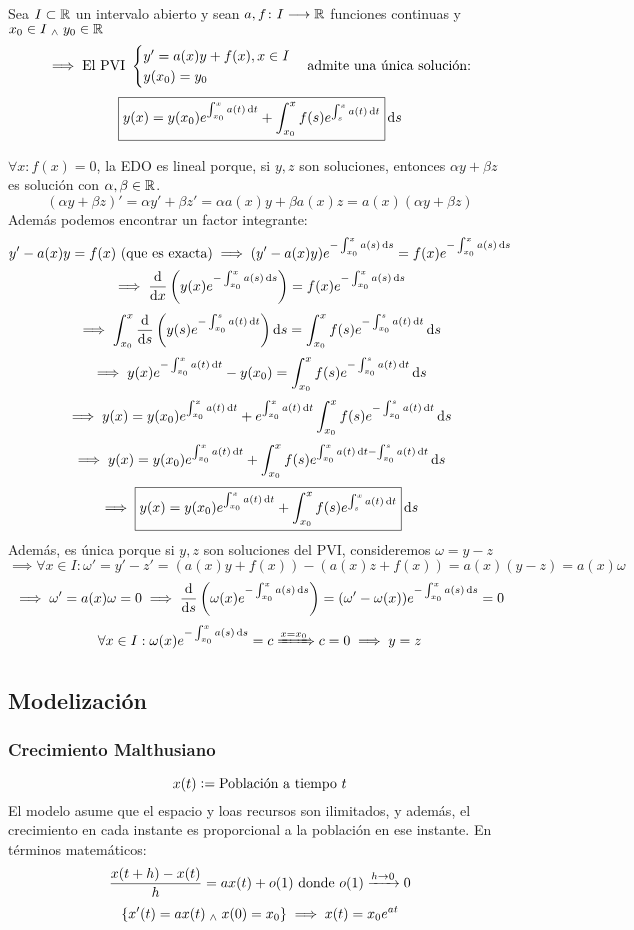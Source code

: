 \begin{teo}[Ejercicio 2.3]
	Sea $I\subset \mathbb{R}$ un intervalo abierto y sean $a, f \colon I \longrightarrow \mathbb{R}$ funciones continuas y $x_0 \in I \; _{\wedge} \; y_0 \in \mathbb{R}$
	\[\implies \text{El PVI } \begin{cases}
		y'=a(x)y + f(x), x\in I\\
		y(x_0) = y_0
	\end{cases} \text{admite una única solución:}\]
	\[\boxed{y(x)=y(x_0)e^{\int_{x_0}^xa(t)\odif{t}}+\int_{x_0}^xf(s)e^{\int_s^xa(t)\odif{t}}} \odif{s}\]
	\begin{dem}
		$\forall x : f(x)=0$, la EDO es lineal porque, si $y, z$ son soluciones, entonces $\alpha y +\beta z$ es solución con $\alpha, \beta \in \mathbb{R}$.
	\[(\alpha y +\beta z)'=\alpha y' + \beta z'= \alpha a(x)y+ \beta a(x)z=a(x)\left(\alpha y + \beta z\right)\]
	Además podemos encontrar un factor integrante:
	\[y'-a(x)y=f(x) \tex{ (que es exacta)} \implies (y'-a(x)y)e^{-\int_{x_0}^xa(s)\odif{s}}=f(x)e^{-\int_{x_0}^xa(s)\odif{s}}\]
	\[\implies \odv{}{x}\left(y(x)e^{-\int_{x_0}^xa(s)\odif{s}}\right)=f(x)e^{-\int_{x_0}^xa(s)\odif{s}}\]
	\[\implies \int_{x_0}^x\odv{}{s}\left(y(s)e^{-\int_{x_0}^sa(t)\odif{t}}\right)\odif{s}=\int_{x_0}^xf(s)e^{-\int_{x_0}^sa(t)\odif{t}}\odif{s}\]
	\[\implies y(x)e^{-\int_{x_0}^xa(t)\odif{t}}-y(x_0)=\int_{x_0}^xf(s)e^{-\int_{x_0}^sa(t)\odif{t}}\odif{s}\]
	\[\implies y(x)=y(x_0)e^{\int_{x_0}^xa(t)\odif{t}}+e^{\int_{x_0}^xa(t)\odif{t}}\int_{x_0}^xf(s)e^{-\int_{x_0}^sa(t)\odif{t}}\odif{s}\]
	\[\implies y(x)=y(x_0)e^{\int_{x_0}^xa(t)\odif{t}}+\int_{x_0}^xf(s)e^{\int_{x_0}^xa(t)\odif{t}-\int_{x_0}^sa(t)\odif{t}}\odif{s}\]
	\[\implies \boxed{y(x)=y(x_0)e^{\int_{x_0}^xa(t)\odif{t}}+\int_{x_0}^xf(s)e^{\int_s^xa(t)\odif{t}}} \odif{s}\]
	Además, es única porque si $y, z$ son soluciones del PVI, consideremos $\omega = y-z$
	\[\implies \forall x \in I :\omega'=y'-z'=(a(x)y+f(x)) - (a(x)z+f(x))=a(x)(y-z)=a(x)\omega\]
	\[\implies \omega'=a(x)\omega=0 \implies \odv{}{s}\left(\omega(x)e^{-\int_{x_0}^xa(s)\odif{s}}\right)=(\omega' - \omega(x))e^{-\int_{x_0}^xa(s)\odif{s} } = 0\]
	\[\forall x\in I : \omega(x)e^{-\int_{x_0}^xa(s)\odif{s} }=c \xRightarrow{x=x_0} c=0 \implies y=z\]
	\end{dem}
\end{teo}

\subsection{Modelización}
\subsubsection{Crecimiento Malthusiano}\label{sec:malthusiano}
\[x(t)\vcentcolon= \text{Población a tiempo $t$}\]
El modelo asume que el espacio y loas recursos son ilimitados, y además, el crecimiento en cada instante es proporcional a la población en ese instante. En términos matemáticos:
\[\frac{x(t+h)-x(t)}{h}=ax(t)+o(1) \text{ donde } o(1)\xrightarrow{h\rightarrow 0}0\]
\[\{x'(t) = ax(t) \; _{\wedge} \; x(0) = x_0\} \implies x(t)=x_0e^{at}\]

